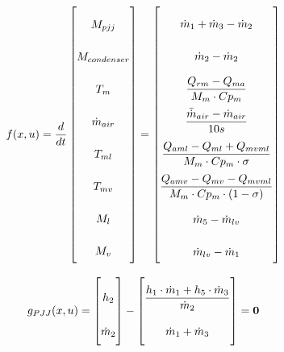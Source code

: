 \begin{equation} \label{eq:consump_x} \renewcommand{\arraystretch}{2.4}
	f(x,u) =  \dfrac{d}{dt} \begin{bmatrix}
		M_{pjj}		\\					%
		M_{condenser} 	\\				%
		T_m 			\\				%
		\dot{m}_{air}	\\				%
		T_{ml}			\\				%
		T_{mv}			\\				%
		M_l				\\				%
		M_v				\\				%
	\end{bmatrix}
	=
	\begin{bmatrix}
		\dot{m}_1 + \dot{m}_3 - \dot{m}_2 \\										%
		\dot{m}_{2} - \dot{m}_{2}	\\												%
		\dfrac{Q_{rm} - Q_{ma}}{M_m \cdot Cp_m} \\									%
		\dfrac{\bar{\dot{m}}_{air}  - \dot{m}_{air}} {10s}		\\					%
		\dfrac{Q_{aml}-Q_{ml} + Q_{mvml}}{M_m \cdot Cp_m \cdot \sigma}        \\	%
		\dfrac{Q_{amv} - Q_{mv} - Q_{mvml}}{M_m \cdot Cp_m \cdot (1- \sigma)}	\\	%
		\dot{m}_{5} - \dot{m}_{lv}		\\											%
		\dot{m}_{lv} - \dot{m}_{1}	\\												%
	\end{bmatrix}
\end{equation}





\begin{equation} \label{eq:consump_x}\renewcommand{\arraystretch}{2.5}
	g_{PJJ}(x,u) =  \begin{bmatrix}
		h_{2}				\\ %
		\dot{m}_{2}			\\ %
	\end{bmatrix}
	-
	\begin{bmatrix}
		\dfrac{h_{1} \cdot \dot{m}_{1} + h_{5} \cdot \dot{m}_{3}}{ \dot{m}_{2} } \\ 	%
		\dot{m}_{1} + \dot{m}_{3} \\													%
	\end{bmatrix}
	=\textbf{0}
\end{equation}


